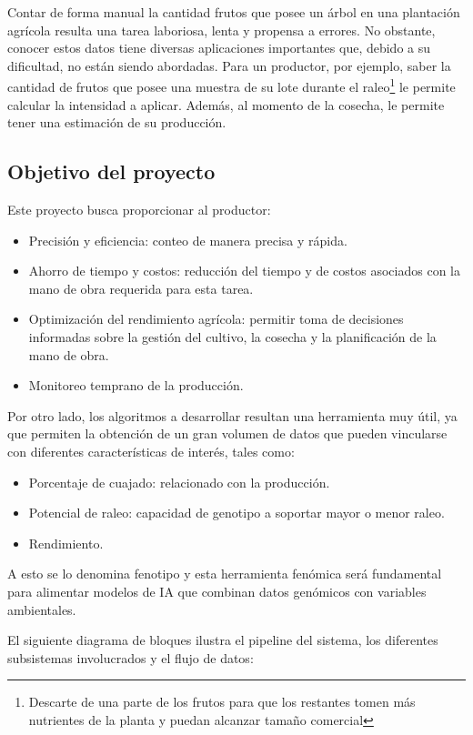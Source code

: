 \documentclass[
11pt %
]{charter}
\begin{document}
Contar de forma manual la cantidad frutos que posee un árbol en una plantación agrícola resulta una tarea laboriosa, lenta y propensa a errores. No obstante, conocer estos datos tiene diversas aplicaciones importantes que, debido a su dificultad, no están siendo abordadas. Para un productor, por ejemplo, saber la cantidad de frutos que posee una muestra de su lote durante el raleo\footnote{Descarte de una parte de los frutos para que los restantes tomen más nutrientes de la planta y puedan alcanzar tamaño comercial} le permite calcular la intensidad a aplicar. Además, al momento de la cosecha, le permite tener una estimación de su producción.

\subsection{Objetivo del proyecto}

Este proyecto busca proporcionar al productor:
\begin{itemize}
	\item Precisión y eficiencia: conteo de manera precisa y rápida.
	\item Ahorro de tiempo y costos: reducción del tiempo y de costos asociados con la mano de obra requerida para esta tarea.
	\item Optimización del rendimiento agrícola: permitir toma de decisiones informadas sobre la gestión del cultivo, la cosecha y la planificación de la mano de obra.
	\item Monitoreo temprano de la producción.
\end{itemize}

Por otro lado, los algoritmos a desarrollar resultan una herramienta muy útil, ya que permiten la obtención de un gran volumen de datos que pueden vincularse con diferentes características de interés, tales como:

\begin{itemize}
	\item Porcentaje de cuajado: relacionado con la producción.
	\item Potencial de raleo: capacidad de genotipo a soportar mayor o menor raleo.
	\item Rendimiento.
\end{itemize}

A esto se lo denomina fenotipo y esta herramienta fenómica será fundamental para
alimentar modelos de IA que combinan datos genómicos con variables ambientales.

El siguiente diagrama de bloques ilustra el pipeline del sistema, los diferentes subsistemas involucrados y el flujo de datos:
\end{document}
